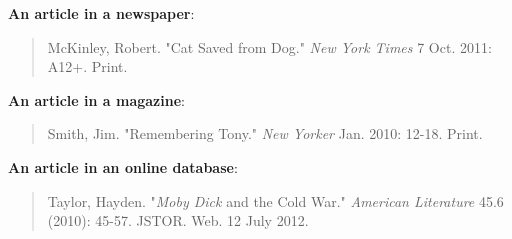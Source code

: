 \textbf{An article in a newspaper}:
\begin{quote}
McKinley, Robert. "Cat Saved from Dog." \emph{New York Times} 7 Oct. 2011:  A12+. 
Print.
\end{quote}

\textbf{An article in a magazine}:
\begin{quote}
Smith, Jim. "Remembering Tony." \emph{New Yorker} Jan. 2010: 12-18. Print.
\end{quote}

\textbf{An article in an online database}:
\begin{quote}
Taylor, Hayden. "\emph{Moby Dick} and the Cold War." \emph{American Literature}  
45.6 (2010): 45-57. 
JSTOR. Web. 12 July 2012.
\end{quote}

